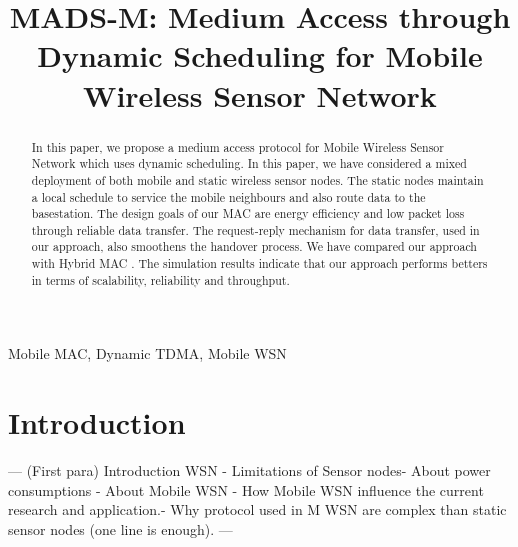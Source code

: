 \documentclass[a4paper, conference, 10pt]{IEEEtran}
\begin{document}
%
\title{MADS-M: Medium Access through Dynamic Scheduling for Mobile Wireless Sensor Network}



\author{
}

\maketitle

\begin{abstract}
	In this paper, we propose a medium access protocol for Mobile Wireless Sensor Network which uses dynamic scheduling. In this paper, we have considered a mixed deployment of both mobile and static wireless sensor nodes. The static nodes maintain a local schedule to service the mobile neighbours and also route data to the basestation. The design goals of our MAC are energy efficiency and low packet loss through reliable data transfer. The request-reply mechanism for data transfer, used in our approach, also smoothens the handover process. We have compared our approach with Hybrid MAC \cite{hmac}. The simulation results indicate that our approach performs betters in terms of scalability, reliability and throughput.%

\end{abstract}

\begin{keywords}
Mobile MAC, Dynamic TDMA, Mobile WSN
\end{keywords}

\IEEEpeerreviewmaketitle

\section{Introduction}
\label{intro}
--- (First para) Introduction  WSN - Limitations of Sensor nodes- About power consumptions - About Mobile WSN - How Mobile WSN influence the current research and application.- Why protocol used in M WSN are complex than static sensor nodes (one line is enough). ---\\ \\
\end{document}
